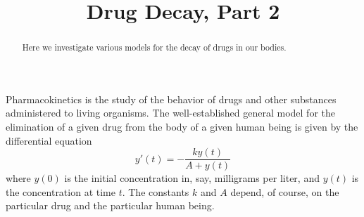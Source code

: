 \documentclass[handout,space,nooutcomes]{ximera}
\title{Drug Decay, Part 2}
\begin{document}
\begin{abstract}
Here we investigate various models for the decay of drugs in our bodies.  
\end{abstract}
\maketitle

Pharmacokinetics is the study of the behavior of drugs and other substances administered to living organisms.  
The well-established general model for 
the elimination of a given drug from the body of a given human being is given by the differential equation 
$$y'(t)=-\frac{ky(t)}{A+y(t)}$$
where $y(0)$ is the initial concentration in, say, milligrams per liter, and $y(t)$ is the concentration at time $t$.  The constants $k$ and $A$ depend, of course, on the particular drug and the particular human being. 

%
%
%
%
%
%
%
\end{document}
